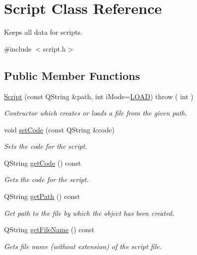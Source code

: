 \hypertarget{class_script}{\section{Script Class Reference}
\label{class_script}
}


Keeps all data for scripts.  




{\ttfamily \#include $<$script.\-h$>$}

\subsection*{Public Member Functions}
\begin{DoxyCompactItemize}
\item 
\hyperlink{class_script_a31bdf4c9dad24a34f89391b65d27ec42}{Script} (const Q\-String \&path, int i\-Mode=\hyperlink{class_script_a95987e80ff92f659bf2366e6b4a42bb1}{L\-O\-A\-D})  throw ( int )
\begin{DoxyCompactList}\small\item\em Contructor which creates or loads a file from the given path. \end{DoxyCompactList}\item 
void \hyperlink{class_script_ae36120acfbb13522b04b19b8893a75c0}{set\-Code} (const Q\-String \&code)
\begin{DoxyCompactList}\small\item\em Sets the code for the script. \end{DoxyCompactList}\item 
Q\-String \hyperlink{class_script_a829824466cc29a1fc019a630a0a64a58}{get\-Code} () const 
\begin{DoxyCompactList}\small\item\em Gets the code for the script. \end{DoxyCompactList}\item 
Q\-String \hyperlink{class_script_a79b3d1c188f66790d4647ce352f978ab}{get\-Path} () const 
\begin{DoxyCompactList}\small\item\em Get path to the file by which the object has been created. \end{DoxyCompactList}\item 
Q\-String \hyperlink{class_script_a4fe7b18819eeebb1ed154f6350ba7fef}{get\-File\-Name} () const 
\begin{DoxyCompactList}\small\item\em Gets file name (without extension) of the script file. \end{DoxyCompactList}\item 

\end{DoxyCompactItemize}

